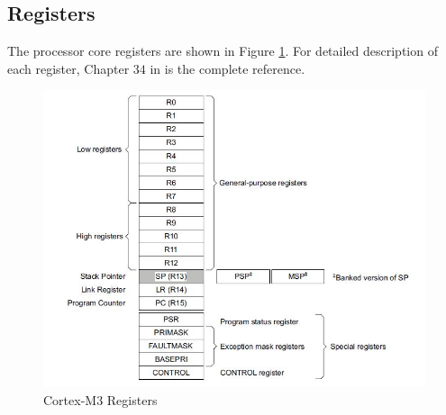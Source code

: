 \subsection{Registers}
\label{sec_cm3_registers}
The processor core registers are shown in Figure \ref{fig_cm3_registers}. For detailed description of each register, Chapter $34$ in \cite{nxp.lpc17xx.manual} is the complete reference. 
\begin{figure}[h]
\centerline{\includegraphics[width=5in]{figure/CM3_Registers}}
\caption[Cortex-M3 Registers] {Cortex-M3 Registers\cite{nxp.lpc17xx.manual}}
\label{fig_cm3_registers}
\end{figure}

